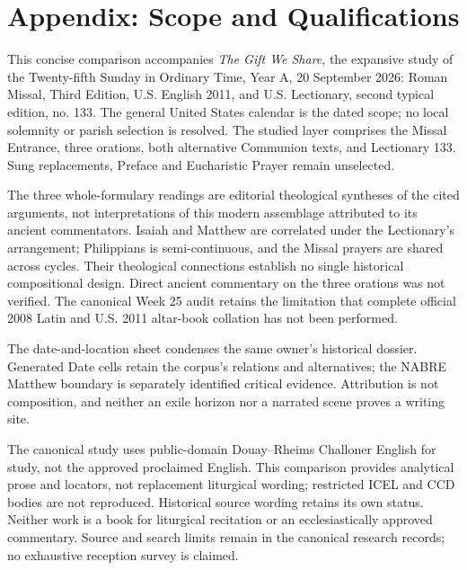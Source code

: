 \section{Appendix: Scope and Qualifications}
This concise comparison accompanies \textit{The Gift We Share}, the expansive study of the Twenty-fifth Sunday in Ordinary Time, Year A, 20 September 2026: Roman Missal, Third Edition, U.S. English 2011, and U.S. Lectionary, second typical edition, no. 133. The general United States calendar is the dated scope; no local solemnity or parish selection is resolved. The studied layer comprises the Missal Entrance, three orations, both alternative Communion texts, and Lectionary 133. Sung replacements, Preface and Eucharistic Prayer remain unselected.

The three whole-formulary readings are editorial theological syntheses of the cited arguments, not interpretations of this modern assemblage attributed to its ancient commentators. Isaiah and Matthew are correlated under the Lectionary's arrangement; Philippians is semi-continuous, and the Missal prayers are shared across cycles. Their theological connections establish no single historical compositional design. Direct ancient commentary on the three orations was not verified. The canonical Week 25 audit retains the limitation that complete official 2008 Latin and U.S. 2011 altar-book collation has not been performed.

The date-and-location sheet condenses the same owner's historical dossier. Generated Date cells retain the corpus's relations and alternatives; the NABRE Matthew boundary is separately identified critical evidence. Attribution is not composition, and neither an exile horizon nor a narrated scene proves a writing site.

The canonical study uses public-domain Douay--Rheims Challoner English for study, not the approved proclaimed English. This comparison provides analytical prose and locators, not replacement liturgical wording; restricted ICEL and CCD bodies are not reproduced. Historical source wording retains its own status. Neither work is a book for liturgical recitation or an ecclesiastically approved commentary. Source and search limits remain in the canonical research records; no exhaustive reception survey is claimed.

